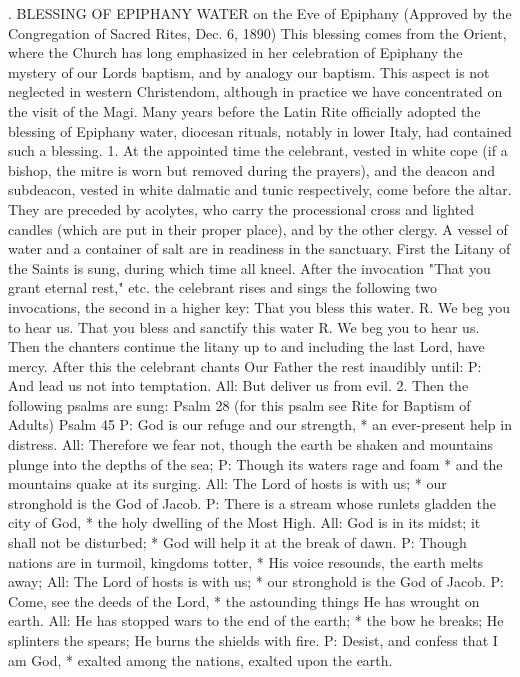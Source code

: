 . BLESSING OF EPIPHANY WATER
on the Eve of Epiphany
(Approved by the Congregation of Sacred Rites, Dec. 6, 1890)
{This blessing comes from the Orient, where the Church has long emphasized in her celebration of Epiphany the mystery of our Lords baptism, and by analogy our baptism. This aspect is not neglected in western Christendom, although in practice we have concentrated on the visit of the Magi. Many years before the Latin Rite officially adopted the blessing of Epiphany water, diocesan rituals, notably in lower Italy, had contained such a blessing.}
1. At the appointed time the celebrant, vested in white cope (if a bishop, the mitre is worn but removed during the prayers), and the deacon and subdeacon, vested in white dalmatic and tunic respectively, come before the altar. They are preceded by acolytes, who carry the processional cross and lighted candles (which are put in their proper place), and by the other clergy. A vessel of water and a container of salt are in readiness in the sanctuary.
First the Litany of the Saints is sung, during which time all kneel. After the invocation "That you grant eternal rest," etc. the celebrant rises and sings the following two invocations, the second in a higher key:
That you bless this water. R. We beg you to hear us. That you bless and sanctify this water R. We beg you to hear us.
Then the chanters continue the litany up to and including the last Lord, have mercy.
After this the celebrant chants Our Father the rest inaudibly until:
P: And lead us not into temptation. 
All: But deliver us from evil.
2. Then the following psalms are sung:
Psalm 28
(for this psalm see Rite for Baptism of Adults)
Psalm 45
P: God is our refuge and our strength, * an ever-present help in distress.
All: Therefore we fear not, though the earth be shaken and mountains plunge into the depths of the sea;
P: Though its waters rage and foam * and the mountains quake at its surging.
All: The Lord of hosts is with us; * our stronghold is the God of Jacob.
P: There is a stream whose runlets gladden the city of God, * the holy dwelling of the Most High.
All: God is in its midst; it shall not be disturbed; * God will help it at the break of dawn.
P: Though nations are in turmoil, kingdoms totter, * His voice resounds, the earth melts away;
All: The Lord of hosts is with us; * our stronghold is the God of Jacob.
P: Come, see the deeds of the Lord, * the astounding things He has wrought on earth.
All: He has stopped wars to the end of the earth; * the bow he breaks; He splinters the spears; He burns the shields with fire.
P: Desist, and confess that I am God, * exalted among the nations, exalted upon the earth.
